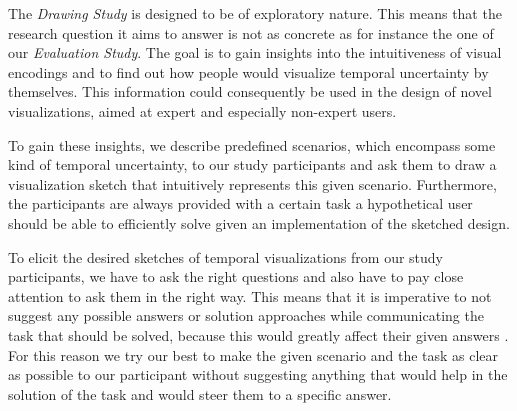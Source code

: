 The \textit{Drawing Study} is designed to be of exploratory nature. This means that the research question it aims to answer is not as concrete as for instance the one of our \textit{Evaluation Study}. The goal is to gain insights into the intuitiveness of visual encodings and to find out how people would visualize temporal uncertainty by themselves. This information could consequently be used in the design of novel visualizations, aimed at expert and especially non-expert users. \par \medskip

To gain these insights, we describe predefined scenarios, which encompass some kind of temporal uncertainty, to our study participants and ask them to draw a visualization sketch that intuitively represents this given scenario. Furthermore, the participants are always provided with a certain task a hypothetical user should be able to efficiently solve given an implementation of the sketched design. \par \medskip

To elicit the desired sketches of temporal visualizations from our study participants, we have to ask the right questions and also have to pay close attention to ask them in the right way. This means that it is imperative to not suggest any possible answers or solution approaches while communicating the task that should be solved, because this would greatly affect their given answers \cite{hullman2016evaluating}. For this reason we try our best to make the given scenario and the task as clear as possible to our participant without suggesting anything that would help in the solution of the task and would steer them to a specific answer. \par \medskip

